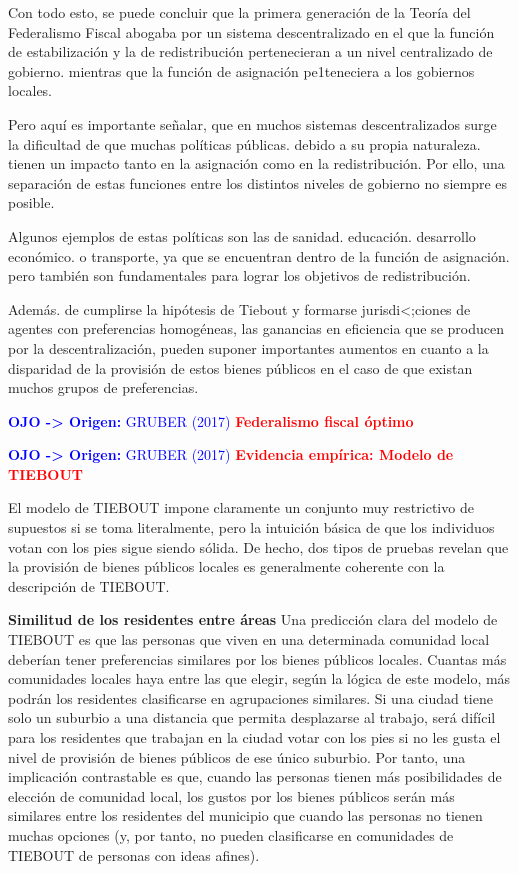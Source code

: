 \documentclass[10pt,a4paper]{article}
\begin{document}
Con todo esto, se puede concluir que la primera generación de la Teoría del Federalismo Fiscal abogaba por un sistema descentralizado en el que la función de estabilización y la de redistribución pertenecieran a un nivel centralizado de gobierno. mientras que la función de asignación pe1teneciera a los gobiernos locales.

Pero aquí es importante señalar, que en muchos sistemas descentralizados surge la dificultad de que muchas políticas públicas. debido a su propia naturaleza. tienen un impacto tanto en la asignación como en la redistribución. Por ello, una separación de estas funciones entre los distintos niveles de gobierno no siempre es posible.

Algunos ejemplos de estas políticas son las de sanidad. educación. desarrollo económico. o transporte, ya que se encuentran dentro de la función de asignación. pero también son fundamentales para lograr los objetivos de redistribución.

Además. de cumplirse la hipótesis de Tiebout y formarse jurisdi<;ciones de agentes con preferencias homogéneas, las ganancias en eficiencia que se producen por la descentralización, pueden suponer importantes aumentos en cuanto a la disparidad de la provisión de estos bienes públicos en el caso de que existan muchos grupos de preferencias.

\textcolor{blue}{\textbf{OJO -> Origen:} GRUBER (2017)}
\textcolor{red}{\textbf{Federalismo fiscal óptimo}}







\textcolor{blue}{\textbf{OJO -> Origen:} GRUBER (2017)}
\textcolor{red}{\textbf{Evidencia empírica: Modelo de TIEBOUT}}

El modelo de TIEBOUT impone claramente un conjunto muy restrictivo de supuestos si se toma literalmente, pero la intuición básica de que los individuos votan con los pies sigue siendo sólida. De hecho, dos tipos de pruebas revelan que la provisión de bienes públicos locales es generalmente coherente con la descripción de TIEBOUT.

\textbf{Similitud de los residentes entre áreas }
Una predicción clara del modelo de TIEBOUT es que las personas que viven en una determinada comunidad local deberían tener preferencias similares por los bienes públicos locales. Cuantas más comunidades locales haya entre las que elegir, según la lógica de este modelo, más podrán los residentes clasificarse en agrupaciones similares. Si una ciudad tiene solo un suburbio a una distancia que permita desplazarse al trabajo, será difícil para los residentes que trabajan en la ciudad votar con los pies si no les gusta el nivel de provisión de bienes públicos de ese único suburbio. Por tanto, una implicación contrastable es que, cuando las personas tienen más posibilidades de elección de comunidad local, los gustos por los bienes públicos serán más similares entre los residentes del municipio que cuando las personas no tienen muchas opciones (y, por tanto, no pueden clasificarse en comunidades de TIEBOUT de personas con ideas afines).
\end{document}
